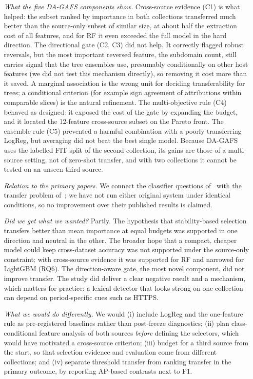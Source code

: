 \textit{What the five DA-GAFS components show.} Cross-source evidence (C1) is what helped: the subset ranked by importance in both collections transferred much better than the source-only subset of similar size, at about half the extraction cost of all features, and for RF it even exceeded the full model in the hard direction. The directional gate (C2, C3) did not help. It correctly flagged robust reversals, but the most important reversed feature, the subdomain count, still carries signal that the tree ensembles use, presumably conditionally on other host features (we did not test this mechanism directly), so removing it cost more than it saved. A marginal association is the wrong unit for deciding transferability for trees; a conditional criterion (for example sign agreement of attributions within comparable slices) is the natural refinement. The multi-objective rule (C4) behaved as designed: it exposed the cost of the gate by expanding the budget, and it located the 12-feature cross-source subset on the Pareto front. The ensemble rule (C5) prevented a harmful combination with a poorly transferring LogReg, but averaging did not beat the best single model. Because DA-GAFS uses the labelled FIT split of the second collection, its gains are those of a multi-source setting, not of zero-shot transfer, and with two collections it cannot be tested on an unseen third source.

\textit{Relation to the primary papers.} We connect the classifier questions of~\cite{sanchez2022} with the transfer problem of~\cite{rashid2024}; we have not run either original system under identical conditions, so no improvement over their published results is claimed.

\textit{Did we get what we wanted?} Partly. The hypothesis that stability-based selection transfers better than mean importance at equal budgets was supported in one direction and neutral in the other. The broader hope that a compact, cheaper model could keep cross-dataset accuracy was not supported under the source-only constraint; with cross-source evidence it was supported for RF and narrowed for LightGBM (RQ6). The direction-aware gate, the most novel component, did not improve transfer. The study did deliver a clear negative result and a mechanism, which matters for practice: a lexical detector that looks strong on one collection can depend on period-specific cues such as HTTPS.

\textit{What we would do differently.} We would (i) include LogReg and the one-feature rule as pre-registered baselines rather than post-freeze diagnostics; (ii) plan class-conditional feature analysis of both sources \emph{before} defining the selectors, which would have motivated a cross-source criterion; (iii) budget for a third source from the start, so that selection evidence and evaluation come from different collections; and (iv) separate threshold transfer from ranking transfer in the primary outcome, by reporting AP-based contrasts next to F1.

